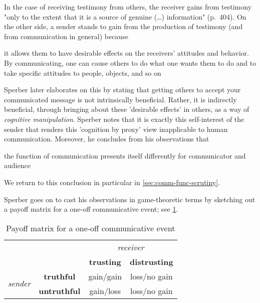 In the case of receiving testimony from others, the receiver gains from testimony "only to the extent that it is a source of genuine (\ldots) information" (p.~404).
On the other side, a sender stands to gain from the production of testimony (and from communication in general) because
\begin{quoting}
    it allows them to have desirable effects on the receivers' attitudes and behavior. By communicating, one can cause others to do what one wants them to do and to take specific attitudes to people, objects, and so on
    \hfill \citep[p.~404]{Sperber01}
\end{quoting}
Sperber later elaborates on this by stating that getting others to accept your communicated message is not intrinsically beneficial. Rather, it is indirectly beneficial, through bringing about these 'desirable effects' in others, as a way of \emph{cognitive manipulation}.
Sperber notes that it is exactly this self-interest of the sender that renders this 'cognition by proxy' view inapplicable to human communication.
Moreover, he concludes from his observations that
\begin{quoting}
    the function of communication presents itself differently for communicator and audience
    \hfill \citep[p.~411]{Sperber01}
\end{quoting}
We return to this conclusion in particular in \cref{sec:comm-func-scrutiny}.

Sperber goes on to cast his observations in game-theoretic terms by sketching out a payoff matrix for a one-off communicative event; see \cref{tab:matrix}.

\begin{table}[ht]
    \centering
    \begin{tabular}{ccc|c}
      \cline{3-4}
      & & \multicolumn{2}{c}{\emph{receiver}} \\ \cline{3-4}
      & & \textbf{trusting} & \textbf{distrusting} \\ \hline
      \multirow{2}{*}{\emph{sender}} &
      \textbf{truthful} & gain/gain & loss/no gain \\ \cline{2-4}
      & \textbf{untruthful} & gain/loss & loss/no gain \\ \hline
    \end{tabular}
    \caption{Payoff matrix for a one-off communicative event}
    \label{tab:matrix}
\end{table}

